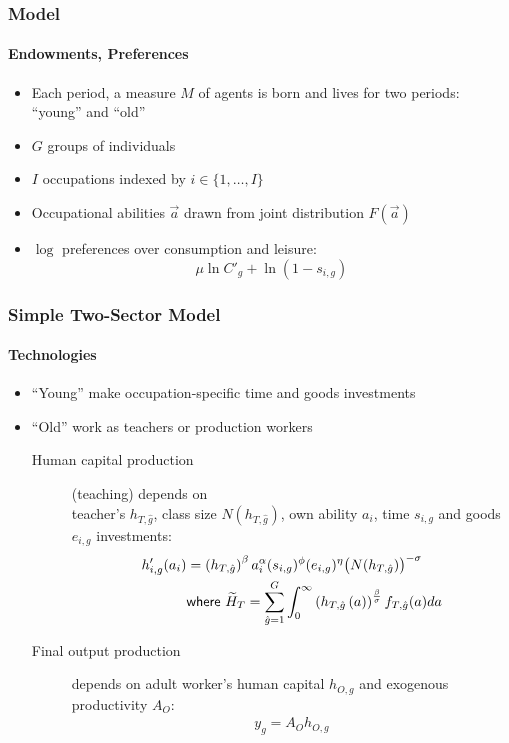 \documentclass[11pt]{beamer}
\begin{document}
	\begin{frame}
		\frametitle{Model}
		\framesubtitle{Endowments, Preferences}
		\begin{itemize}
			\item Each period, a measure $M$ of agents is born and lives for two periods: ``young'' and ``old''
			\item $G$ groups of individuals
			\item $I$ occupations indexed by $i \in \{1,\dots,I\}$
			\item Occupational abilities $\vec{a}$ drawn from joint distribution $F(\vec{a})$
			\item $\log$ preferences over consumption and leisure:
			\begin{displaymath}
				\mu \ln C'_{g} + \ln\left(1-s_{i,g} \right)
			\end{displaymath}
		\end{itemize}
	\end{frame}
	
	\begin{frame}
		\frametitle{Simple Two-Sector Model}
		\framesubtitle{Technologies}
		\begin{itemize}
			\item ``Young'' make occupation-specific time and goods investments
			\item ``Old'' work as \alert{teachers} or \alert{production workers}
			\begin{description}
				\item[Human capital production] (teaching) depends on\\
				teacher's $h_{T,\hat{g}}$, class size $N(h_{T,\hat{g}})$,  own ability $a_i$, time $s_{i,g}$ and goods $e_{i,g}$ investments:
				\begin{align*}
					\label{}
					h'_{i,g}(a_i) & =\left( h_{T,\hat{g}}\right)^\beta a_i^\alpha(s_{i,g})^{\phi} (e_{i,g})^{\eta}\big(N(h_{T,\hat{g}})\big)^{-\sigma}\\
					& \textrm{{\sf where }} \widetilde{H}_T =\sum_{\hat{g}=1}^G \int_0^\infty \left( h_{T,\hat{g}}\left( a \right) \right)^{\frac{\beta}{\sigma}} f_{T,\hat{g}}(a) da
				\end{align*}
				\item[Final output production] depends on adult worker's human capital $h_{O,g}$ and exogenous productivity $A_O$:
				\begin{align*}
					\label{}
					y_g = A_O h_{O,g}
				\end{align*}
			\end{description}
		\end{itemize}
	\end{frame}
	
\end{document}
